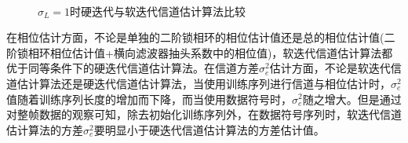 \begin{figure}
    \centering
    \\
    \caption{$\sigma_L=1$时硬迭代与软迭代信道估计算法比较}
    \label{fig:4.4}
\end{figure}
在相位估计方面，不论是单独的二阶锁相环的相位估计值还是总的相位估计值(二阶锁相环相位估计值+横向滤波器抽头系数中的相位值)，软迭代信道估计算法都优于同等条件下的硬迭代信道估计算法。在信道方差$\sigma_e^2$估计方面，不论是软迭代信道估计算法还是硬迭代信道估计算法，当使用训练序列进行信道与相位估计时，$\sigma_e^2$值随着训练序列长度的增加而下降，而当使用数据符号时，$\sigma_e^2$随之增大。但是通过对整帧数据的观察可知，除去初始化训练序列外，在数据符号序列时，软迭代信道估计算法的方差$\sigma_e^2$要明显小于硬迭代信道估计算法的方差估计值。

